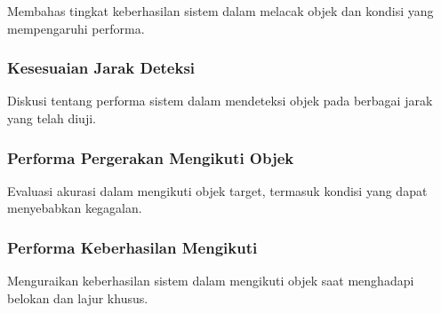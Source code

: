 Membahas tingkat keberhasilan sistem dalam melacak objek dan kondisi yang mempengaruhi performa.

\subsubsection{Kesesuaian Jarak Deteksi}
\label{subsec:kesesuaianjarak}

Diskusi tentang performa sistem dalam mendeteksi objek pada berbagai jarak yang telah diuji.

\subsubsection{Performa Pergerakan Mengikuti Objek}
\label{subsec:akurasiikutiobjek}

Evaluasi akurasi dalam mengikuti objek target, termasuk kondisi yang dapat menyebabkan kegagalan.

\subsubsection{Performa Keberhasilan Mengikuti}
\label{subsec:keberhasilanmengikuti}

Menguraikan keberhasilan sistem dalam mengikuti objek saat menghadapi belokan dan lajur khusus.